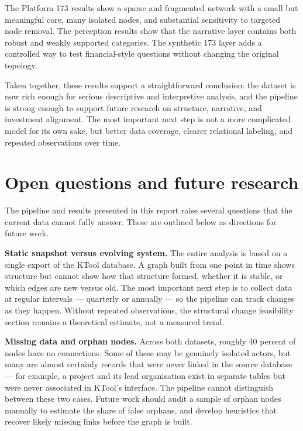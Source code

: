 \documentclass[11pt,a4paper]{article}
\begin{document}
The Platform 173 results show a sparse and fragmented network with a
small but meaningful core, many isolated nodes, and substantial
sensitivity to targeted node removal. The perception results show that
the narrative layer contains both robust and weakly supported
categories. The synthetic 173 layer adds a controlled way to test
financial-style questions without changing the original topology.

Taken together, these results support a straightforward conclusion: the
dataset is now rich enough for serious descriptive and interpretive
analysis, and the pipeline is strong enough to support future research
on structure, narrative, and investment alignment. The most important
next step is not a more complicated model for its own sake, but better
data coverage, clearer relational labeling, and repeated observations
over time.

\section{Open questions and future research}

The pipeline and results presented in this report raise several questions
that the current data cannot fully answer. These are outlined below as
directions for future work.

\textbf{Static snapshot versus evolving system.} The entire analysis is based
on a single export of the KTool database. A graph built from one point
in time shows structure but cannot show how that structure formed,
whether it is stable, or which edges are new versus old. The most
important next step is to collect data at regular intervals — quarterly
or annually — so the pipeline can track changes as they happen. Without
repeated observations, the structural change feasibility section remains
a theoretical estimate, not a measured trend.

\textbf{Missing data and orphan nodes.} Across both datasets, roughly 40
percent of nodes have no connections. Some of these may be genuinely
isolated actors, but many are almost certainly records that were never
linked in the source database — for example, a project and its lead
organisation exist in separate tables but were never associated in
KTool's interface. The pipeline cannot distinguish between these two
cases. Future work should audit a sample of orphan nodes manually to
estimate the share of false orphans, and develop heuristics that recover
likely missing links before the graph is built.
\end{document}
